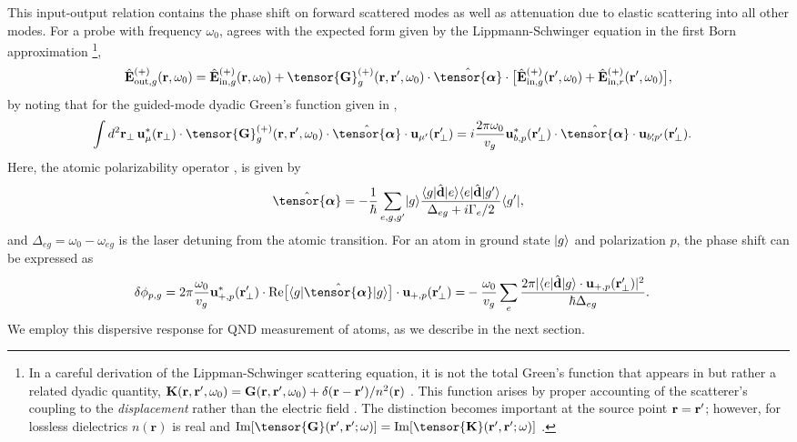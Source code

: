 \documentclass[preprint, aps,pra,onecolumn]{revtex4-1} %
\newcommand{\inp}{{\rm in}}
\newcommand{\out}{{\rm out}}
\newcommand{\poltens}{\hat{\tensor{\boldsymbol{\alpha}}}}
\begin{document}
This input-output relation contains the phase shift on forward scattered modes as well as attenuation due to elastic scattering into all other modes. For a probe with frequency $\omega_0$,  agrees with the expected form given by the Lippmann-Schwinger equation in the first Born approximation \footnote{In a careful derivation of the Lippman-Schwinger scattering equation, it is not the total Green's function that appears in  but rather a related dyadic quantity, $\mathbf{K}(\mathbf{r},\mathbf{r}', \omega_0) = \mathbf{G}(\mathbf{r},\mathbf{r}', \omega_0) + \delta(\mathbf{r}-\mathbf{r}')/n^2(\mathbf{r})$ \cite{wubs_multiple-scattering_2004}. 
This function arises by proper accounting of the scatterer's coupling to the \emph{displacement} rather than the electric field \cite{yao_ultrahigh_2009}.  The distinction becomes important at the source point $\mathbf{r} = \mathbf{r}'$; however, for lossless dielectrics $n(\mathbf{r})$ is real and ${\rm Im}[\tensor{\mathbf{G}}(\br',\br'; \omega)] = {\rm Im}[\tensor{\mathbf{K}}(\br',\br'; \omega)]$ \cite{yao_-chip_2010}. },
	\begin{equation} \label{Eq::IOScatteredField}
		\hat{\mathbf{E}}^{(+)}_{\out,g}(\br, \omega_0)=\hat{\mathbf{E}}^{(+)}_{ \inp, g}(\br, \omega_0)+\tensor{\mathbf{G}}_g^{(+)}(\br,\br', \omega_0)\cdot \poltens \cdot \big[\hat{\mathbf{E}}^{(+)}_{\inp, g}(\br', \omega_0)+\hat{\mathbf{E}}^{(+)}_{\inp,r}(\br', \omega_0) \big],
	\end{equation}
by noting that for the guided-mode dyadic Green's function given in ,
	\begin{align}
		\int d^2 \mbf{r}_\perp \, \mathbf{u}^*_{\mu} (\br_\perp)\cdot \tensor{\mathbf{G}}_g^{(+)}(\br,\br',\omega_0)\cdot \poltens \cdot \mathbf{u}_{\mu'} (\br'_\perp) &= i \frac{ 2\pi \omega_0}{v_g} \mathbf{u}^*_{b,p} (\br'_\perp) \cdot \poltens \cdot \mathbf{u}_{b'\!\!, p'} (\br'_\perp).  
	\end{align}
Here, the atomic polarizability operator \cite{buhmann_casimir-polder_2004, deutsch_quantum_2010,kien_dynamical_2013}, is given by
	\begin{equation} \label{Eq::PolarizabilityOperator}
		\poltens = - \frac{1}{\hbar} \sum_{e,g,g'}\ket{g}\frac{\bra{g}\hat{\mathbf{d}}\ket{e}\bra{e} 
\hat{\mathbf{d}}\ket{g'}}{\Delta_{eg} + i \Gamma_{e}/2 }\bra{g'},
	\end{equation}	
and $\Delta_{eg} = \omega_0 - \omega_{eg}$ is the laser detuning from the atomic transition.	
For an atom in ground state $\lvert{g}\rangle$ and polarization $p$, the phase shift can be expressed as \cite{le_kien_propagation_2014}
	\begin{align} \label{Eq::PhaseShiftMultilevel}
		\delta  \phi_{p,g} =2\pi \frac{ \omega_{0} }{v_g} \mathbf{u}^*_{+, p}(\br'_\perp) \cdot {\rm Re}\big[\bra{g} \hat{\tensor{\boldsymbol{\alpha}}} \ket{g} \big] \cdot \mathbf{u}_{+, p}(\br'_\perp) =& -\frac{ \omega_{0} }{v_g} \sum_e \frac{2 \pi |\bra{e}\hat{\mathbf{d}}\ket{g} \cdot \mathbf{u}_{+,p}(\br'_\perp)|^2}{ \hbar  \Delta_{eg} } .
	\end{align}  
We employ this dispersive response for QND measurement of atoms, as we describe in the next section.
\end{document}
